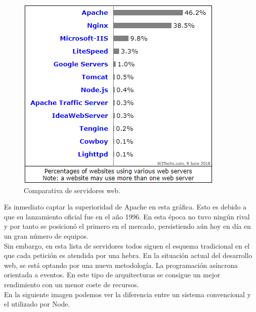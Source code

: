 \begin{figure}[H]
	\centering
	\includegraphics[scale=0.75]{imagenes/web-servers-comparison.png}
	\caption{Comparativa de servidores web.\cite{web-server-usage} \label{fig:figura2}}
\end{figure}

Es inmediato captar la superioridad de Apache\cite{apache} en esta gráfica. Esto es debido a que su lanzamiento 
oficial fue en el año 1996. En esta época no tuvo ningún rival y por tanto se posicionó el primero en el mercado, 
persistiendo aún hoy en día en un gran número de equipos.\\

Sin embargo, en esta lista de servidores todos siguen el esquema tradicional en el que cada petición es atendida 
por una hebra. En la situación actual del desarrollo web, se está optando por una nueva metodología. La programación
asíncrona orientada a eventos. En este tipo de arquitecturas se consigue un mejor rendimiento con un menor coste 
de recursos. \\

En la siguiente imagen podemos ver la diferencia entre un sistema convencional y el utilizado por Node.

